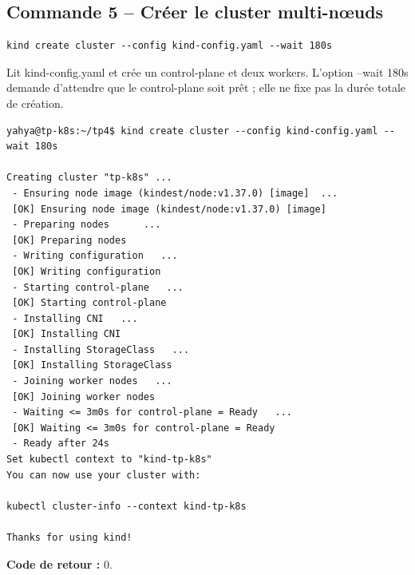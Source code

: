 \documentclass[11pt,a4paper]{article}
\begin{document}
\subsection{Commande 5 -- Créer le cluster multi-nœuds}
\begin{lstlisting}
kind create cluster --config kind-config.yaml --wait 180s
\end{lstlisting}
Lit kind-config.yaml et crée un control-plane et deux workers. L’option --wait 180s demande d’attendre que le control-plane soit prêt ; elle ne fixe pas la durée totale de création.
\begin{tcolorbox}[terminal,title={Ubuntu / WSL2 -- Commande 5 -- rendu reconstitué}]
\begin{Verbatim}[fontsize=\scriptsize,breaklines=true,breakanywhere=true,breaksymbolleft={},breaksymbolright={}]
yahya@tp-k8s:~/tp4$ kind create cluster --config kind-config.yaml --wait 180s

Creating cluster "tp-k8s" ...
 - Ensuring node image (kindest/node:v1.37.0) [image]  ...
 [OK] Ensuring node image (kindest/node:v1.37.0) [image]
 - Preparing nodes      ...
 [OK] Preparing nodes    
 - Writing configuration   ...
 [OK] Writing configuration 
 - Starting control-plane   ...
 [OK] Starting control-plane 
 - Installing CNI   ...
 [OK] Installing CNI 
 - Installing StorageClass   ...
 [OK] Installing StorageClass 
 - Joining worker nodes   ...
 [OK] Joining worker nodes 
 - Waiting <= 3m0s for control-plane = Ready   ...
 [OK] Waiting <= 3m0s for control-plane = Ready 
 - Ready after 24s 
Set kubectl context to "kind-tp-k8s"
You can now use your cluster with:

kubectl cluster-info --context kind-tp-k8s

Thanks for using kind!
\end{Verbatim}
\end{tcolorbox}
\textbf{Code de retour :} 0.
\end{document}
